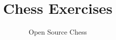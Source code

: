 \documentclass[a4paper,12pt]{book}
\begin{document}
\author{Open Source Chess}
\title{Chess Exercises}
\date{}

\maketitle

\mainmatter
\setcounter{page}{3}







\end{document}
